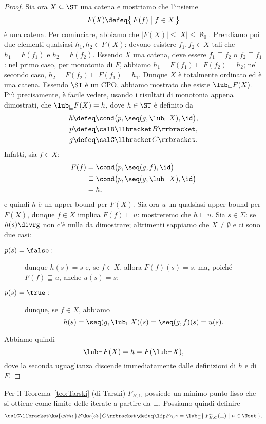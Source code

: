 \begin{proof}
Sia ora $X \subseteq \ST$ una catena e mostriamo che l'insieme
\[
  F(X) \defeq \bigl\{\, F(f) \bigm| f \in X \,\bigr\}
\]
\`e una catena.
Per cominciare, abbiamo che $\bigl|F(X)\bigr| \leq |X| \leq \aleph_0$.
Prendiamo poi due elementi qualsiasi $h_1, h_2 \in F(X)$:
devono esistere $f_1, f_2 \in X$ tali che $h_1 = F(f_1)$ e $h_2 = F(f_2)$.
Essendo $X$ una catena, deve essere $f_1 \sqsubseteq f_2$
o $f_2 \sqsubseteq f_1$: nel primo caso, per monotonia di $F$, abbiamo
$h_1 = F(f_1) \sqsubseteq F(f_2) = h_2$;
nel secondo caso,
$h_2 = F(f_2) \sqsubseteq F(f_1) = h_1$.
Dunque $X$ \`e totalmente ordinato ed \`e una catena.
Essendo $\ST$ \`e un CPO, abbiamo mostrato che esiste $\lub_{\sqsubseteq} F(X)$.
Più precisamente, \`e facile vedere, usando i risultati di monotonia
appena dimostrati, che $\lub_{\sqsubseteq} F(X) = h$,
dove $h \in \ST$ è definito da
\begin{align*}
  h &\defeq \cond\bigl(p, \seq(g, \lub_{\sqsubseteq} X), \id\bigr), \\
  p &\defeq \calB \llbracket B \rrbracket, \\
  g &\defeq \calC \llbracket C \rrbracket.
\end{align*}
Infatti, sia $f \in X$:
\begin{align*}
  F(f)
    &=
      \cond\bigl(p, \seq(g, f), \id\bigr) \\
    &\sqsubseteq
      \cond\bigl(p, \seq(g, \lub_{\sqsubseteq} X), \id\bigr) \\
    &= h,
\end{align*}
e quindi $h$ \`e un upper bound per $F(X)$.
Sia ora $u$ un qualsiasi upper bound per $F(X)$,
dunque $f \in X$ implica $F(f) \sqsubseteq u$:
mostreremo che $h \sqsubseteq u$.
Sia $s \in \Sigma$:
se $h(s)\divrg$ non c'\`e nulla da dimostrare;
altrimenti sappiamo che $X \neq \emptyset$ e
ci sono due casi:
\begin{description}
\item[$p(s) = \false:$]
dunque $h(s) = s$ e, se $f \in X$, allora $F(f)(s) = s$,
ma, poich\'e $F(f) \sqsubseteq u$, anche $u(s) = s$;
\item[$p(s) = \true:$]
dunque, se $f \in X$, abbiamo
\[
  h(s) = \seq(g, \lub_{\sqsubseteq} X)(s) = \seq(g, f)(s) = u(s).
\]
\end{description}
Abbiamo quindi
\[
  \lub_{\sqsubseteq} F(X) = h = F(\lub_{\sqsubseteq} X),
\]
dove la seconda uguaglianza discende immediatamente dalle definizioni
di $h$ e di $F$.
\end{proof}

Per il Teorema~\ref{teo:Tarski} (di Tarski)
$F_{B,C}$ possiede un minimo punto fisso che si ottiene come
limite delle iterate a partire da $\bot$.
Possiamo quindi definire
\[
  \calC \llbracket \kw{while} B \kw{do} C \rrbracket
    \defeq \lfp F_{B,C}
    = \lub_{\sqsubseteq} \bigl\{\, F_{B,C}^n(\bot) \bigm| n \in \Nset \,\bigr\}.
\]

